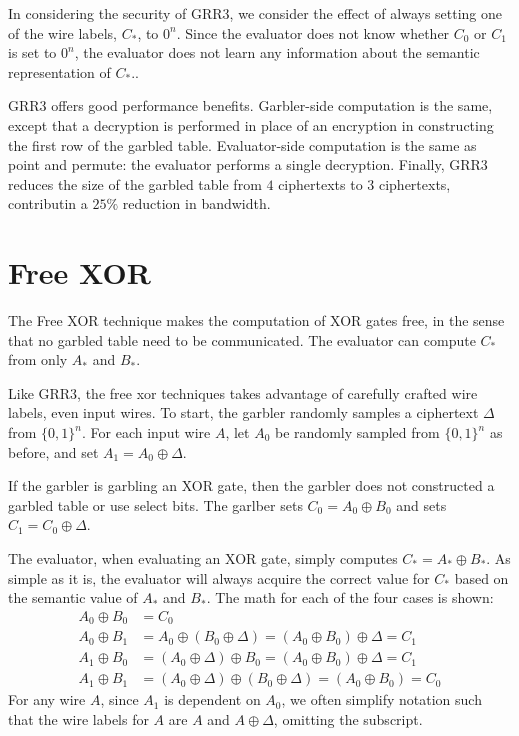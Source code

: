 In considering the security of GRR3, we consider the effect of always setting one of the wire labels, $C_*$, to $0^n$.
Since the evaluator does not know whether $C_0$ or $C_1$ is set to $0^n$, the evaluator does not learn any information about the semantic representation of $C_*$..

GRR3 offers good performance benefits.
Garbler-side computation is the same, except that a decryption is performed in place of an encryption in constructing the first row of the garbled table.
Evaluator-side computation is the same as point and permute: the evaluator performs a single decryption.
Finally, GRR3 reduces the size of the garbled table from $4$ ciphertexts to $3$ ciphertexts, contributin a $25\%$ reduction in bandwidth.

\section{Free XOR}
The Free XOR technique makes the computation of XOR gates free, in the sense that no garbled table need to be communicated.
The evaluator can compute $C_*$ from only $A_*$ and $B_*$.

Like GRR3, the free xor techniques takes advantage of carefully crafted wire labels, even input wires.
To start, the garbler randomly samples a ciphertext $\Delta$ from $\{0,1\}^n$.
For each input wire $A$, let $A_0$ be randomly sampled from $\{0,1\}^n$ as before, and set $A_1 = A_0 \oplus \Delta$.

If the garbler is garbling an XOR gate, then the garbler does not constructed a garbled table or use select bits.
The garlber sets $C_0 = A_0 \oplus B_0$ and sets $C_1 = C_0 \oplus \Delta$.

The evaluator, when evaluating an XOR gate, simply computes $C_* = A_* \oplus B_*$.
As simple as it is, the evaluator will always acquire the correct value for $C_*$ based on the semantic value of $A_*$ and $B_*$.
The math for each of the four cases is shown:
\begin{align*}
    A_0 \oplus B_0 & = C_0 \\
    A_0 \oplus B_1 & = A_0 \oplus (B_0 \oplus \Delta) = (A_0 \oplus B_0) \oplus \Delta = C_1 \\
    A_1 \oplus B_0 & = (A_0 \oplus \Delta) \oplus B_0 = (A_0 \oplus B_0) \oplus \Delta = C_1 \\
    A_1 \oplus B_1 & = (A_0 \oplus \Delta) \oplus (B_0 \oplus \Delta) = (A_0 \oplus B_0) = C_0
\end{align*}
For any wire $A$, since $A_1$ is dependent on $A_0$, we often simplify notation such that the wire labels for $A$ are $A$ and $A \oplus \Delta$, omitting the subscript.

